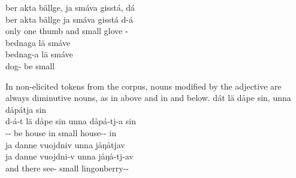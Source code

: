 	
\z
\ea\label{smallADJex3}
\glll	ber akta bällge, ja smáva gisstá, dá\\
	ber akta bällge ja smáva gisstá d-á\\
	only one thumb\BS{} and small glove\BS{} -\BS{}\\\nopagebreak
{}	
\z
\ea\label{smallADJex4}
\glll	bednaga lä smáve\\
	bednag-a lä smáve\\
	dog- be\BS{} small\BS{}\\\nopagebreak
{}	
\z

In non-elicited tokens from the corpus, nouns modified by the adjective  are always diminutive nouns, as in  above and in  and  below.
\ea\label{smallADJex5}
\glll	dát lä dåpe sin, unna dåpátja sin\\
	d-á-t lä dåpe sin unna dåpá-tj-a sin\\
	-- be\BS{} house\BS{} in small house-- in\\\nopagebreak
{}	
\z
\ea\label{smallADJex6}
\glll	ja danne vuojdniv unna jåŋåtjav\\
	ja danne vuojdni-v unna jåŋå-tj-av\\
	and there see- small lingonberry--\\\nopagebreak
{}	
\z


